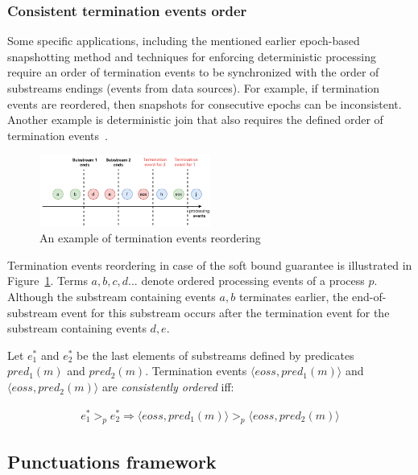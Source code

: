 \subsubsection{Consistent termination events order}
Some specific applications, including the mentioned earlier epoch-based snapshotting method and techniques for enforcing deterministic processing~\cite{we2018adbis} require an order of termination events to be synchronized with the order of substreams endings (events from data sources). For example, if termination events are reordered, then snapshots for consecutive epochs can be inconsistent. Another example is deterministic join that also requires the defined order of termination events~\cite{gulisano2016scalejoin}.

\begin{figure}[htbp]
  \centering
  \includegraphics[width=0.50\textwidth]{pics/notifications-reordering.pdf}
  \caption{An example of termination events reordering}
  \label{notifications_reordering}
\end{figure}

Termination events reordering in case of the soft bound guarantee is illustrated in Figure~\ref{notifications_reordering}. Terms $a,b,c,d...$ denote ordered processing events of a process $p$. Although the substream containing events $a,b$ terminates earlier, the end-of-substream event for this substream occurs after the termination event for the substream containing events $d,e$. 

Let $e^{*}_1$ and $e^{*}_2$ be the last elements of substreams defined by predicates $pred_1(m)$ and $pred_2(m)$. Termination events $\langle eoss, pred_1(m)\rangle$ and $\langle eoss, pred_2(m)\rangle$ are {\em consistently ordered} iff:

\begin{align*}
e^{*}_1 >_p e^{*}_2 \Longrightarrow \langle eoss, pred_1(m)\rangle >_p \langle eoss, pred_2(m)\rangle
\end{align*}

\subsection{Punctuations framework}

